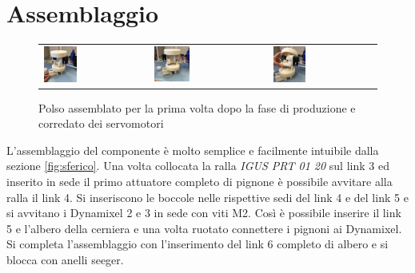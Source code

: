\documentclass[%
corpo=11pt,
twoside,
 stile=classica,
oldstyle,
greek,%
]{toptesi}
\begin{document}
	\section{Assemblaggio}
	\begin{figure}
		\centering
		\begin{tabular}{lll}
			\includegraphics[width=0.33\textwidth]{image/w1.jpg}
			&
			\includegraphics[width=0.33\textwidth]{image/w2.jpg}
			&
			\includegraphics[width=0.33\textwidth]{image/w3.jpg}
		\end{tabular}
		\caption{Polso assemblato per la prima volta dopo la fase di produzione e corredato dei servomotori}
		\label{fig:wristassembled}
	\end{figure}
	L'assemblaggio del componente è molto semplice e facilmente intuibile dalla sezione \ref{fig:sferico}. Una volta collocata la ralla \textit{IGUS PRT 01 20} sul link 3 ed inserito in sede il primo attuatore completo di pignone è possibile avvitare alla ralla il link 4. Si inseriscono le boccole nelle rispettive sedi del link 4 e del link 5 e si avvitano i Dynamixel 2 e 3 in sede con viti M2. Così è possibile inserire il link 5 e l'albero della cerniera e una volta ruotato connettere i pignoni ai Dynamixel. Si completa l'assemblaggio con l'inserimento del link 6 completo di albero e si blocca con anelli seeger.\\
\end{document}
